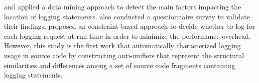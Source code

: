 \citet{fu2014developers} and \citet{zhu2015learning} applied a data mining approach to detect the main factors impacting the location of logging statements. \citet{fu2014developers} also conducted a questionnaire survey to validate their findings. \citet{ding2015log2} proposed an constraint-based approach to decide whether to log for each logging request at run-time in order to minimize the performance overhead. However, this study is the first work that automatically characterized logging usage in source code by constructing anti-unifiers that represent the structural similarities and differences among a set of source code fragments containing logging statements.










